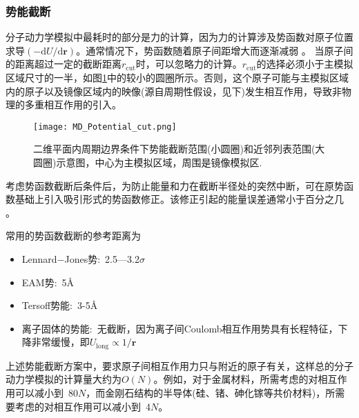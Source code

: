 \subsubsection{势能截断}
分子动力学模拟中最耗时的部分是力的计算，因为力的计算涉及势函数对原子位置求导$(-\mathrm{d}U/\mathrm{d}\mathbf{r})$。通常情况下，势函数随着原子间距增大而逐渐减弱%
。%
当原子间的距离超过一定的截断距离$r_{\mathrm{cut}}$时，可以忽略力的计算。$r_{\mathrm{cut}}$的选择必须小于主模拟区域尺寸的一半，如图\ref{MD_R_cut}中的较小的圆圈所示。否则，这个原子可能与主模拟区域内的原子以及镜像区域内的映像(源自周期性假设，见下)发生相互作用，导致非物理的多重相互作用的引入。
\begin{figure}[h!]
\centering
\vspace*{-0.1in}
\texttt{[image: MD\_Potential\_cut.png]}
\caption{{二维平面内周期边界条件下势能截断范围(小圆圈)和近邻列表范围(大圆圈)示意图，中心为主模拟区域，周围是镜像模拟区.}}%
\label{MD_R_cut}
\end{figure}
考虑势函数截断后条件后，为防止能量和力在截断半径处的突然中断，可在原势函数基础上引入吸引形式的势函数修正。该修正引起的能量误差通常小于百分之几%
。

常用的势函数截断的参考距离为
\begin{itemize}
	\item \textrm{Lennard−Jones}势:~2.5—3.2$\sigma$
	\item \textrm{EAM}势:~5\AA
	\item \textrm{Tersoff}势能:~3-5\AA
	\item 离子固体的势能:~无截断，因为离子间\textrm{Coulomb}相互作用势具有长程特征，下降非常缓慢，即$U_{\mathrm{long}}\propto1/\mathbf{r}$
\end{itemize}
上述势能截断方案中，要求原子间相互作用力只与附近的原子有关，这样总的分子动力学模拟的计算量大约为$O(N)$。例如，对于金属材料，所需考虑的对相互作用可以减小到~80$N$，而金刚石结构的半导体(硅、锗、砷化镓等共价材料)，所需要考虑的对相互作用可以减小到~4$N$。


